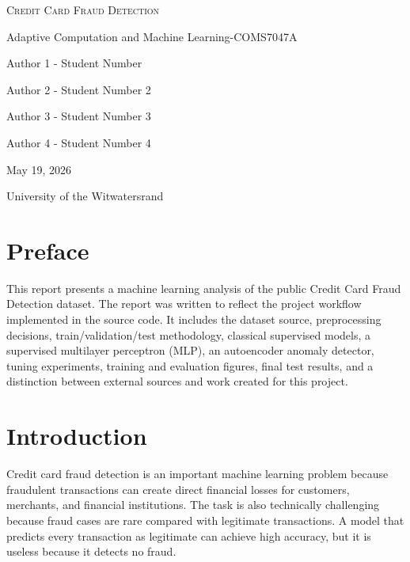 \documentclass[12pt,a4paper]{report}
\begin{document}

\begin{titlepage}
    \centering
    \vspace*{1.2cm}
    {\Huge\scshape Credit Card Fraud Detection\par}
    \vspace{0.7cm}
    {\Large Adaptive Computation and Machine Learning-COMS7047A\par}
    \vspace{1.0cm}
    {\large Author 1 - Student Number\par}
    {\large Author 2 - Student Number 2\par}
    {\large Author 3 - Student Number 3\par}
    {\large Author 4 - Student Number 4\par}
    \vspace{1.2cm}
    {\large May 19, 2026\par}
    \vfill
    {\large University of the Witwatersrand\par}
\end{titlepage}


\chapter*{Preface}

This report presents a machine learning analysis of the public Credit Card Fraud Detection dataset. The report was written to reflect the project workflow implemented in the source code. It includes the dataset source, preprocessing decisions, train/validation/test methodology, classical supervised models, a supervised multilayer perceptron (MLP), an autoencoder anomaly detector, tuning experiments, training and evaluation figures, final test results, and a distinction between external sources and work created for this project.

\tableofcontents
\listoffigures
\listoftables

\clearpage
{}

\chapter{Introduction}

Credit card fraud detection is an important machine learning problem because fraudulent transactions can create direct financial losses for customers, merchants, and financial institutions. The task is also technically challenging because fraud cases are rare compared with legitimate transactions. A model that predicts every transaction as legitimate can achieve high accuracy, but it is useless because it detects no fraud.
\end{document}
